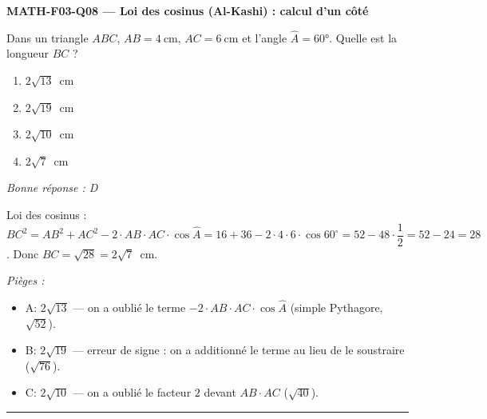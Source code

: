 \documentclass[11pt,a4paper]{article}
\begin{document}
\noindent\textbf{MATH-F03-Q08 --- Loi des cosinus (Al-Kashi) : calcul d'un côté}\par
Dans un triangle $ABC$, $AB=\qty{4}{\centi\metre}$, $AC=\qty{6}{\centi\metre}$ et l'angle $\widehat{A}=\ang{60}$. Quelle est la longueur $BC$ ?
\begin{enumerate}[label=\Alph*)]
\item $2\sqrt{13}$~\si{\centi\metre}
\item $2\sqrt{19}$~\si{\centi\metre}
\item $2\sqrt{10}$~\si{\centi\metre}
\item $2\sqrt{7}$~\si{\centi\metre}
\end{enumerate}
\textit{Bonne réponse : D}\par
Loi des cosinus : $BC^2=AB^2+AC^2-2\cdot AB\cdot AC\cdot\cos\widehat{A}=16+36-2\cdot4\cdot6\cdot\cos 60^\circ=52-48\cdot\dfrac12=52-24=28$. Donc $BC=\sqrt{28}=2\sqrt{7}$~\si{\centi\metre}.\par
\textit{Pièges :}
\begin{itemize}
\item A: $2\sqrt{13}$ --- on a oublié le terme $-2\cdot AB\cdot AC\cdot\cos\widehat{A}$ (simple Pythagore, $\sqrt{52}$).
\item B: $2\sqrt{19}$ --- erreur de signe : on a additionné le terme au lieu de le soustraire ($\sqrt{76}$).
\item C: $2\sqrt{10}$ --- on a oublié le facteur $2$ devant $AB\cdot AC$ ($\sqrt{40}$).
\end{itemize}
\vspace{8pt}\hrule\vspace{8pt}
\end{document}
